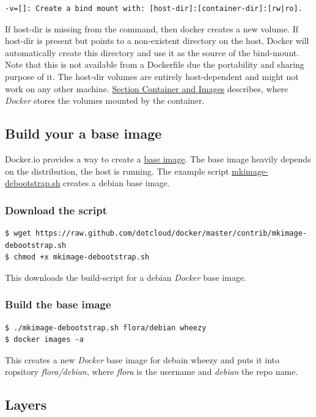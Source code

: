 \documentclass[captions=tableheading]{article}
\begin{document}
\begin{verbatim}
-v=[]: Create a bind mount with: [host-dir]:[container-dir]:[rw|ro].
\end{verbatim}
If host-dir is missing from the command, then docker creates a new volume. If host-dir is present but points to a non-existent directory on the host, Docker will automatically create this directory and use it as the source of the bind-mount.
Note that this is not available from a Dockerfile due the portability and sharing purpose of it. The host-dir volumes are entirely host-dependent and might not work on any other machine. \hyperref[sec-2-5]{Section Container and Images} describes, where \emph{Docker} stores the volumes mounted by the container.
\subsection{Build your a base image}
\label{sec-2-3}

Docker.io provides a way to create a \href{http://docs.docker.io/en/latest/articles/baseimages/}{base image}. The base image heavily depends on the distribution, the host is running. The example script \href{https://github.com/dotcloud/docker/blob/master/contrib/mkimage-debootstrap.sh}{mkimage-debootstrap.sh} creates a debian base image.
\subsubsection{Download the script}
\label{sec-2-3-1}


\begin{verbatim}
$ wget https://raw.github.com/dotcloud/docker/master/contrib/mkimage-debootstrap.sh
$ chmod +x mkimage-debootstrap.sh
\end{verbatim}
This downloads the build-script for a debian \emph{Docker} base image.
\subsubsection{Build the base image}
\label{sec-2-3-2}


\begin{verbatim}
$ ./mkimage-debootstrap.sh flora/debian wheezy 
$ docker images -a
\end{verbatim}
This creates a new \emph{Docker} base image for debain wheezy and puts it into ropsitory \emph{flora/debian}, where \emph{flora} is the username and \emph{debian} the repo name.
\subsection{Layers}
\label{sec-2-4}
\end{document}
